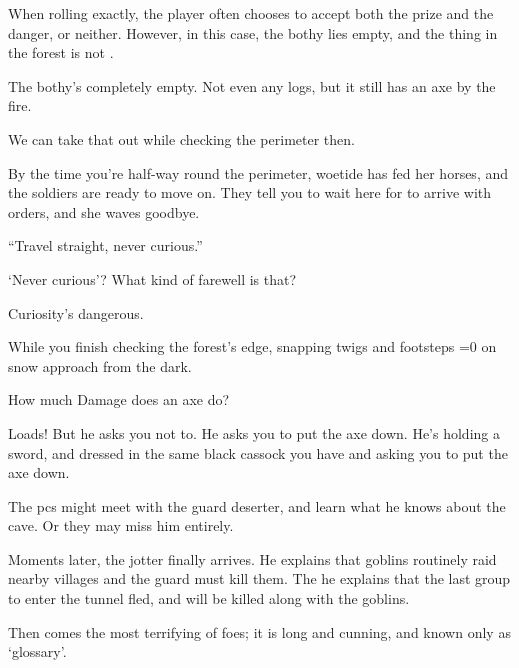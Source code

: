 \begin{multicols}{2}
\vspace{\baselineskip}
\noindent
When rolling  exactly, the player often chooses to accept both the prize and the danger, or neither.
However, in this case, the \gls{bothy} lies empty, and the thing in the forest is not .

\vspace{\baselineskip}
\bigLine

\begin{description}\sf
  \item[\Gls{gm}:]
  The \gls{bothy}'s completely empty.
  Not even any logs, but it still has an axe by the fire.
  \item[Player 1:]
  We can take that out while checking the perimeter then.
  \item[\Gls{gm}:]
  By the time you're half-way round the perimeter, \gls{woetide} has fed her horses, and the \glspl{soldier} are ready to move on.
  They tell you to wait here for  to arrive with orders, and she waves goodbye.

  ``Travel straight, never curious.''
  \item[Player 2:]
  `Never curious'?
  What kind of farewell is that?
  \item[Player 1:]
  Curiosity's dangerous.

  \item[\Gls{gm}:]
  While you finish checking the forest's edge, snapping twigs and footsteps
  \ifnum\value{temperature}=0%
    on snow
  \fi%
  approach from the dark.
  \item[Player 2:]
  How much Damage does an axe do?
  \item[\Glsentrytext{gm}:]
  Loads!
  But he asks you not to.
  He asks you to put the axe down.
  He's holding a sword, and dressed in the same black cassock you have and asking you to put the axe down.
\end{description}

\bigLine
\vspace{2em}
\noindent
The \glspl{pc} might meet with the \gls{guard} deserter, and learn what he knows about the cave.
Or they may miss him entirely.

Moments later, the \gls{jotter} finally arrives.
He explains that goblins routinely raid nearby \glspl{village} and the \gls{guard} must kill them.
The he explains that the last group to enter the tunnel fled, and will be killed along with the goblins.

Then comes the most terrifying of foes; it is long and cunning, and known only as `glossary'.

\end{multicols}
